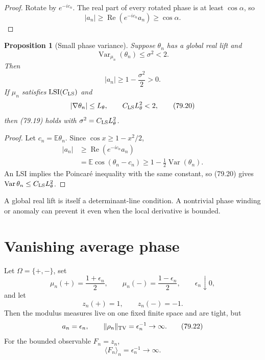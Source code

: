 \documentclass[11pt]{article}
\newtheorem{proposition}[theorem]{Proposition}
\theoremstyle{remark}
\begin{document}
\begin{proof}
Rotate by \(e^{-ic_n}\).  The real part of every rotated phase is
at least \(\cos\alpha\), so
\[
 |a_n|\geq
 \operatorname{Re}(e^{-ic_n}a_n)\geq\cos\alpha.
\]
\end{proof}

\begin{proposition}[Small phase variance]
\label{prop:v15v79-variance}
Suppose \(\theta_n\) has a global real lift and
\[
 \operatorname{Var}_{\mu_n}(\theta_n)\leq\sigma^2<2.  \tag{79.18}
\]
Then
\[
 |a_n|\geq1-\frac{\sigma^2}{2}>0.                     \tag{79.19}
\]
If \(\mu_n\) satisfies \({\rm LSI}(C_{\rm LS})\) and
\[
 |\nabla\theta_n|\leq L_\theta,\qquad
 C_{\rm LS}L_\theta^2<2,                              \tag{79.20}
\]
then (79.19) holds with
\(\sigma^2=C_{\rm LS}L_\theta^2\).
\end{proposition}

\begin{proof}
Let \(c_n=\mathbb E\theta_n\).  Since
\(\cos x\geq1-x^2/2\),
\[
\begin{split}
 |a_n|
 &\geq
 \operatorname{Re}(e^{-ic_n}a_n)\\
 &=
 \mathbb E\cos(\theta_n-c_n)
 \geq1-\frac12\operatorname{Var}(\theta_n).
\end{split}
\]
An LSI implies the Poincar\'e inequality with the same constant,
so (79.20) gives
\(\operatorname{Var}\theta_n\leq C_{\rm LS}L_\theta^2\).
\end{proof}

A global real lift is itself a determinant-line condition.  A
nontrivial phase winding or anomaly can prevent it even when the
local derivative is bounded.

\section{Vanishing average phase}

\begin{counterexample}
\label{cnt:v15v79-sign}
Let \(\Omega=\{+,-\}\), set
\[
 \mu_n(+)=\frac{1+\epsilon_n}{2},\qquad
 \mu_n(-)=\frac{1-\epsilon_n}{2},\qquad
 \epsilon_n\downarrow0,
\]
and let
\[
 z_n(+)=1,\qquad z_n(-)=-1.                           \tag{79.21}
\]
Then the modulus measures live on one fixed finite space and are
tight, but
\[
 a_n=\epsilon_n,\qquad
 \|\rho_n\|_{\rm TV}=\epsilon_n^{-1}\to\infty.         \tag{79.22}
\]
For the bounded observable \(F_n=z_n\),
\[
 \langle F_n\rangle_n=\epsilon_n^{-1}\to\infty.       \tag{79.23}
\]
\end{counterexample}
\end{document}
